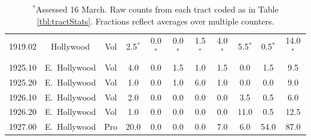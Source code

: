 \documentclass[11pt,twocolumn]{article}
\begin{document}
\begin{table}[t]
\begin{tabular}{ccccccccccc}
1919.02 & Hollywood & Vol & 2.5$^{\ast}$ &  0.0$^{\ast}$ &  0.0$^{\ast}$ &  1.5$^{\ast}$ &  4.0$^{\ast}$ &  5.5$^{\ast}$ &  0.5$^{\ast}$ &  14.0$^{\ast}$ \\
1925.10 & E.~Hollywood & Vol &  4.0 &  0.0 &  1.5 &  1.0 &  1.5 &  0.0 &  1.5 &   9.5 \\
1925.20 & E.~Hollywood & Vol &  1.0 &  0.0 &  1.0 &  6.0 &  1.0 &  0.0 &  0.0 &   9.0 \\
1926.10 & E.~Hollywood & Vol &  2.0 &  0.0 &  0.0 &  0.0 &  0.0 &  3.5 &  0.5 &   6.0 \\
1926.20 & E.~Hollywood & Vol &  1.0 &  0.0 &  0.0 &  0.0 &  0.0 & 11.0 &  0.5 &  12.5 \\
1927.00 & E.~Hollywood & Pro & 20.0 &  0.0 &  0.0 &  0.0 &  7.0 &  6.0 & 54.0 &  87.0 \\
\bottomrule
\end{tabular}
\caption*{$^{\ast}$Assessed 16 March. Raw counts from each tract coded as in Table \ref{tbl:tractStats}. 
		Fractions reflect averages over multiple counters.}
\label{tbl:allCount}
\end{table}
\end{document}
